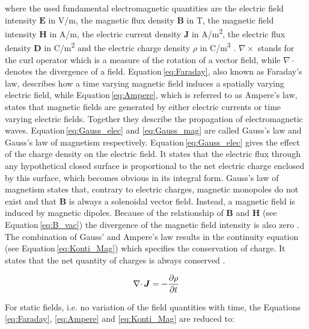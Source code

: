 where the used fundamental electromagnetic quantities are the electric field intensity $\boldsymbol{E}$ in V/m, the magnetic flux density $\boldsymbol{B}$ in T, the magnetic field intensity $\boldsymbol{H}$ in A/m, the electric current density $\boldsymbol{J}$ in A/m\textsuperscript{2}, the electric flux density $\boldsymbol{D}$ in C/m\textsuperscript{2} and the electric charge density $\rho$ in C/m\textsuperscript{3} \cite{meschede2015gerthsen,monk2003finite}. $\nabla\times$ stands for the curl operator which is a measure of the rotation of a vector field, while $\nabla\cdotp$ denotes the divergence of a field. Equation\,\ref{eq:Faraday}, also known as Faraday's law, describes how a time varying magnetic field induces a spatially varying electric field, while Equation\,\ref{eq:Ampere}, which is referred to as Ampere's law, states that magnetic fields are generated by either electric currents or time varying electric fields. Together they describe the propagation of electromagnetic waves. Equation\,\ref{eq:Gauss_elec} and \ref{eq:Gauss_mag} are called Gauss's law and Gauss's law of magnetism respectively. Equation\,\ref{eq:Gauss_elec} gives the effect of the charge density on the electric field. It states that the electric flux through any hypothetical closed surface is proportional to the net electric charge enclosed by this surface, which becomes obvious in its integral form. Gauss's law of magnetism states that, contrary to electric charges, magnetic monopoles do not exist and that $\boldsymbol{B}$ is always a solenoidal vector field. Instead, a magnetic field is induced by magnetic dipoles. Because of the relationship of $\boldsymbol{B}$ and $\boldsymbol{H}$ (see Equation\,\ref{eq:B_vac}) the divergence of the magnetic field intensity is also zero \cite{monk2003finite,kallenbach2018elektromagnete}.
The combination of Gauss' and Ampere's law results in the continuity equation (see Equation\,\ref{eq:Konti_Mag}) which specifies the conservation of charge. It states that the net quantity of charges is always conserved \cite{monk2003finite,meschede2015gerthsen,schwab2013begriffswelt}.   

\begin{equation}
\label{eq:Konti_Mag}
\centering
\nabla\cdotp\boldsymbol{J} = -\frac{\partial\rho}{\partial t}
\end{equation}

For static fields, i.e. no variation of the field quantities with time, the Equations \ref{eq:Faraday}, \ref{eq:Ampere} and \ref{eq:Konti_Mag} are reduced to:

